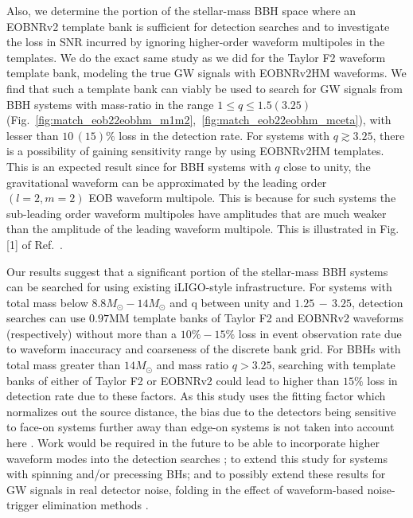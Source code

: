 \documentclass[aps,
prd,
amsmath,
amssymb,
twocolumn,
floatfix,
groupedaddress]{revtex4-1}
\newcommand{\MM}{\mathrm{MM}}
\begin{document}
Also, we determine the portion of the stellar-mass BBH space where an EOBNRv2 template bank is sufficient for detection searches and to investigate the loss in SNR incurred by ignoring higher-order waveform multipoles in the templates. We do the exact same study as we did for the Taylor F2 waveform template bank, modeling the true GW signals with EOBNRv2HM waveforms. We find that such a template bank can viably be used to search for GW signals from BBH systems with mass-ratio in the range $1\leq q\leq 1.5 (3.25)$ (Fig.~\ref{fig:match_eob22eobhm_m1m2},~\ref{fig:match_eob22eobhm_mceta}), with lesser than $10\, (15)\%$ loss in the detection rate. For systems with $q\gtrsim 3.25$, there is a possibility of gaining sensitivity range by using EOBNRv2HM templates. This is an expected result since for BBH systems with $q$ close to unity, the gravitational waveform can be approximated by the leading order $(l=2,m=2)$ EOB waveform multipole. This is because for such systems the sub-leading order waveform multipoles 
have amplitudes that are much weaker than the amplitude of the leading waveform multipole. This is illustrated in Fig.[1] of Ref.~\citep{BuonannoEOBv2Main}.

Our results suggest that a significant portion of the stellar-mass BBH systems can be searched for using existing iLIGO-style infrastructure. For systems with total mass below $8.8M_{\odot}-14M_{\odot}$ and q between unity and $1.25\,-\,3.25$, detection searches can use $0.97\MM$ template banks of Taylor F2 and EOBNRv2 waveforms (respectively) without more than a $10\%-15\%$ loss in event observation rate due to waveform inaccuracy and coarseness of the discrete bank grid. For BBHs with total mass greater than $14M_{\odot}$ and mass ratio $q> 3.25$, searching with template banks of either of Taylor F2 or EOBNRv2 could lead to higher than $15\%$ loss in detection rate due to these factors. As this study uses the fitting factor which normalizes out the source distance, the bias due to the detectors being sensitive to face-on systems further away than edge-on systems is not taken into account here \citep{LarneHMStudyDL}. Work would be required in the future to be able to incorporate higher waveform modes into 
the detection searches \citep{HigherHarmonicsDAsearch}; to extend this study for systems with spinning and/or precessing BHs; and to possibly extend these results for GW signals in real detector noise, folding in the effect of waveform-based noise-trigger elimination methods \citep{Allen:2004gu}.

\end{document}
